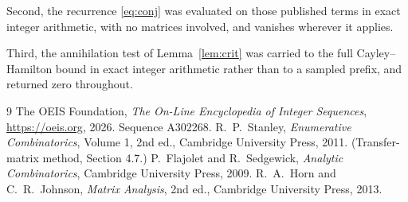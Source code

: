 \documentclass[11pt,a4paper]{article}
\theoremstyle{plain}
\theoremstyle{definition}
\begin{document}
Second, the recurrence \eqref{eq:conj} was evaluated on those published terms in exact
integer arithmetic, with no matrices involved, and vanishes wherever it applies.

Third, the annihilation test of Lemma~\ref{lem:crit} was carried to the full
Cayley--Hamilton bound in exact integer arithmetic rather than to a sampled prefix, and
returned zero throughout.

\begin{thebibliography}{9}
 The OEIS Foundation, \emph{The On-Line Encyclopedia of Integer
Sequences}, \url{https://oeis.org}, 2026. Sequence A302268.
 R.~P.~Stanley, \emph{Enumerative Combinatorics}, Volume 1, 2nd ed.,
Cambridge University Press, 2011. (Transfer-matrix method, Section 4.7.)
 P.~Flajolet and R.~Sedgewick, \emph{Analytic Combinatorics}, Cambridge
University Press, 2009.
 R.~A.~Horn and C.~R.~Johnson, \emph{Matrix Analysis}, 2nd ed., Cambridge
University Press, 2013.
\end{thebibliography}
\end{document}

